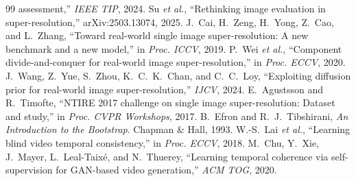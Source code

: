 \documentclass[conference]{IEEEtran}
\begin{document}
\begin{thebibliography}{99}
  assessment,'' \emph{IEEE TIP}, 2024.
 Su \emph{et al.}, ``Rethinking image evaluation in super-resolution,'' arXiv:2503.13074, 2025.
 J.~Cai, H.~Zeng, H.~Yong, Z.~Cao, and L.~Zhang, ``Toward real-world single image super-resolution: A
  new benchmark and a new model,'' in \emph{Proc. ICCV}, 2019.
 P.~Wei \emph{et al.}, ``Component divide-and-conquer for real-world image super-resolution,'' in
  \emph{Proc. ECCV}, 2020.
 J.~Wang, Z.~Yue, S.~Zhou, K.~C.~K.~Chan, and C.~C.~Loy, ``Exploiting diffusion prior for
  real-world image super-resolution,'' \emph{IJCV}, 2024.
 E.~Agustsson and R.~Timofte, ``NTIRE 2017 challenge on single image super-resolution: Dataset and
  study,'' in \emph{Proc. CVPR Workshops}, 2017.
 B.~Efron and R.~J.~Tibshirani, \emph{An Introduction to the Bootstrap}. Chapman \& Hall, 1993.
 W.-S.~Lai \emph{et al.}, ``Learning blind video temporal consistency,'' in \emph{Proc. ECCV}, 2018.
 M.~Chu, Y.~Xie, J.~Mayer, L.~Leal-Taix\'e, and N.~Thuerey, ``Learning temporal coherence via
  self-supervision for GAN-based video generation,'' \emph{ACM TOG}, 2020.
\end{thebibliography}
\end{document}
